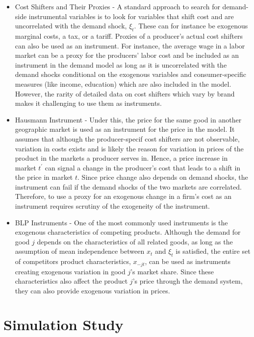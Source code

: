 \documentclass[a4paper,11pt]{article}
\begin{document}
    \begin{itemize}
        \item Cost Shifters and Their Proxies - A standard approach to search for demand-side instrumental variables is to look for variables that shift cost and are uncorrelated with the demand shock, $\xi_{t}$. These can for instance be exogenous marginal costs, a tax, or a tariff. Proxies of a producer's actual cost shifters can also be used as an instrument. For instance, the average wage in a labor market can be a proxy for the producers' labor cost and be included as an instrument in the demand model as long as it is uncorrelated with the demand shocks conditional on the exogenous variables and consumer-specific measures (like income, education) which are also included in the model. However, the rarity of detailed data on cost shifters which vary by brand makes it challenging to use them as instruments.
        \item Hausmann Instrument - Under this, the price for the same good in another geographic market is used as an instrument for the price in the model. It assumes that although the producer-specif cost shifters are not observable, variation in costs exists and is likely the reason for variation in prices of the product in the markets a producer serves in. Hence, a price increase in market $t^{\prime}$ can signal a change in the producer's cost that leads to a shift in the price in market $t$. Since price change also depends on demand shocks, the instrument can fail if the demand shocks of the two markets are correlated. Therefore, to use a proxy for an exogenous change in a firm's cost as an instrument requires scrutiny of the exogeneity of the instrument.
        \item BLP Instruments - One of the most commonly used instruments is the exogenous characteristics of competing products. Although the demand for good $j$ depends on the characteristics of all related goods, as long as the assumption of mean independence between $x_{t}$ and $\xi_{t}$ is satisfied, the entire set of competitors product characteristics, $x_{-jt}$, can be used as instruments creating exogenous variation in good $j$’s market share. Since these characteristics also affect the product $j$'s price through the demand system, they can also provide exogenous variation in prices.
    \end{itemize}

\clearpage
\section{Simulation Study}
\label{sec:Simulation}
\end{document}

